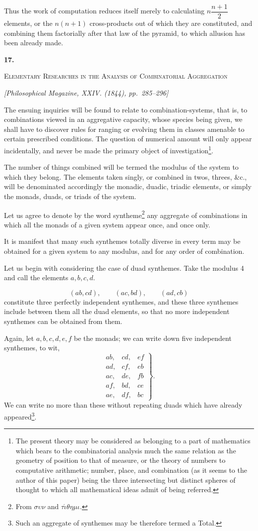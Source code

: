 \documentclass[11pt]{article}
\newcommand{\paperhead}[3]{%
  \clearpage
  \begin{center}
  {\Large\bfseries #1.}\par\vspace{0.85em}
  {\large\scshape #2}\par\vspace{0.6em}
  {\itshape [#3]}\par
  \end{center}\vspace{0.4em}}
\newcommand{\sourcepage}[1]{\marginpar{\scriptsize p.~#1}}
\begin{document}
Thus the work of computation reduces itself merely to calculating $n\dfrac{n+1}{2}$ elements, or the $n(n+1)$ cross-products out of which they are constituted, and combining them factorially after that law of the pyramid, to which allusion has been already made.

\paperhead{17}{Elementary Researches in the Analysis of Combinatorial Aggregation}{Philosophical Magazine, XXIV. (1844), pp.~285--296}

\sourcepage{91}
The ensuing inquiries will be found to relate to combination-systems, that is, to combinations viewed in an aggregative capacity, whose species being given, we shall have to discover rules for ranging or evolving them in classes amenable to certain prescribed conditions. The question of numerical amount will only appear incidentally, and never be made the primary object of investigation\footnote{The present theory may be considered as belonging to a part of mathematics which bears to the combinatorial analysis much the same relation as the geometry of position to that of measure, or the theory of numbers to computative arithmetic; number, place, and combination (as it seems to the author of this paper) being the three intersecting but distinct spheres of thought to which all mathematical ideas admit of being referred.}.

The number of things combined will be termed the modulus of the system to which they belong. The elements taken singly, or combined in twos, threes, \&c., will be denominated accordingly the monadic, duadic, triadic elements, or simply the monads, duads, or triads of the system.

Let us agree to denote by the word syntheme\footnote{From $\sigma\upsilon\nu$ and $\tau\acute{\iota}\theta\eta\mu\iota$.} any aggregate of combinations in which all the monads of a given system appear once, and once only.

It is manifest that many such synthemes totally diverse in every term may be obtained for a given system to any modulus, and for any order of combination.

Let us begin with considering the case of duad synthemes. Take the modulus 4 and call the elements $a,b,c,d$.

\[(ab,cd),\qquad (ac,bd),\qquad (ad,cb)\]
constitute three perfectly independent synthemes, and these three synthemes include between them all the duad elements, so that no more independent synthemes can be obtained from them.

\sourcepage{92}
Again, let $a,b,c,d,e,f$ be the monads; we can write down five independent synthemes, to wit,
\[
\left.\begin{array}{lll}
ab,& cd,& ef\\
ad,& cf,& eb\\
ac,& de,& fb\\
af,& bd,& ce\\
ae,& df,& bc
\end{array}\right\}.
\]
We can write no more than these without repeating duads which have already appeared\footnote{Such an aggregate of synthemes may be therefore termed a Total.}.
\end{document}
